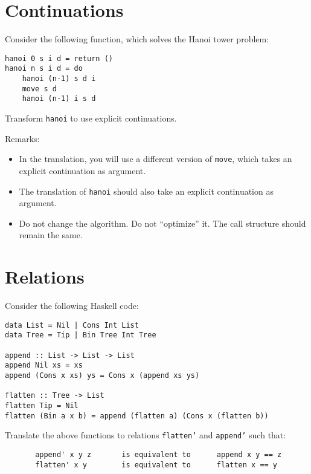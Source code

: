 \documentclass{article}
\newcommand{\answer}[1]{}
\begin{document}
\section{Continuations}

Consider the following function, which solves the Hanoi tower problem:
\begin{verbatim}
hanoi 0 s i d = return ()
hanoi n s i d = do
    hanoi (n-1) s d i
    move s d 
    hanoi (n-1) i s d 
\end{verbatim}

Transform \texttt{hanoi} to use explicit continuations. 

Remarks: 
\begin{itemize}
\item In the translation, you will use a different version of
  \texttt{move}, which takes an explicit continuation as argument.
\item The translation of \texttt{hanoi} should also take an explicit
  continuation as argument.
\item Do not change the algorithm. Do not ``optimize'' it. The call
  structure should remain the same.
\end{itemize}

\answer{
hanoi 0 s i d k = k ()
hanoi n s i d k = 
    hanoi (n-1) s d i (
    move s d          (
    hanoi (n-1) i s d 
    k))
}

\section{Relations}

Consider the following Haskell code:

\begin{verbatim}
data List = Nil | Cons Int List
data Tree = Tip | Bin Tree Int Tree

append :: List -> List -> List
append Nil xs = xs
append (Cons x xs) ys = Cons x (append xs ys)

flatten :: Tree -> List
flatten Tip = Nil
flatten (Bin a x b) = append (flatten a) (Cons x (flatten b))
\end{verbatim}

Translate the above functions to relations \texttt{flatten'} and
\texttt{append'} such that:
\begin{verbatim}
       append' x y z       is equivalent to      append x y == z
       flatten' x y        is equivalent to      flatten x == y
\end{verbatim}
\end{document}
